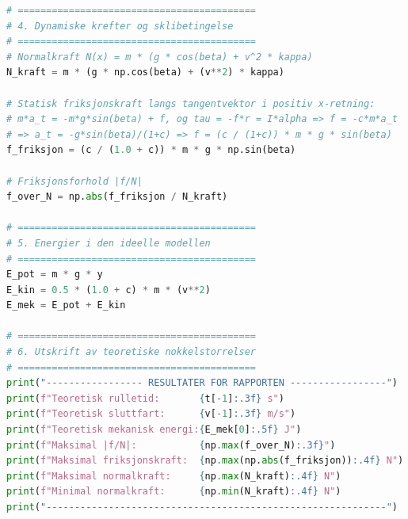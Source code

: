 \documentclass[11pt,a4paper]{article}
\begin{document}
\begin{lstlisting}[language=Python, caption={Python-skript for numerisk modellering og analyse av rullende kule på krum bane (\texttt{lab\_2.py}).}]
# ==========================================
# 4. Dynamiske krefter og sklibetingelse
# ==========================================
# Normalkraft N(x) = m * (g * cos(beta) + v^2 * kappa)
N_kraft = m * (g * np.cos(beta) + (v**2) * kappa)

# Statisk friksjonskraft langs tangentvektor i positiv x-retning:
# m*a_t = -m*g*sin(beta) + f, og tau = -f*r = I*alpha => f = -c*m*a_t
# => a_t = -g*sin(beta)/(1+c) => f = (c / (1+c)) * m * g * sin(beta)
f_friksjon = (c / (1.0 + c)) * m * g * np.sin(beta)

# Friksjonsforhold |f/N|
f_over_N = np.abs(f_friksjon / N_kraft)

# ==========================================
# 5. Energier i den ideelle modellen
# ==========================================
E_pot = m * g * y
E_kin = 0.5 * (1.0 + c) * m * (v**2)
E_mek = E_pot + E_kin

# ==========================================
# 6. Utskrift av teoretiske nokkelstorrelser
# ==========================================
print("----------------- RESULTATER FOR RAPPORTEN -----------------")
print(f"Teoretisk rulletid:       {t[-1]:.3f} s")
print(f"Teoretisk sluttfart:      {v[-1]:.3f} m/s")
print(f"Teoretisk mekanisk energi:{E_mek[0]:.5f} J")
print(f"Maksimal |f/N|:           {np.max(f_over_N):.3f}")
print(f"Maksimal friksjonskraft:  {np.max(np.abs(f_friksjon)):.4f} N")
print(f"Maksimal normalkraft:     {np.max(N_kraft):.4f} N")
print(f"Minimal normalkraft:      {np.min(N_kraft):.4f} N")
print("------------------------------------------------------------")
\end{lstlisting}
\end{document}
